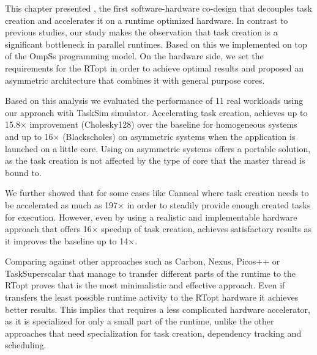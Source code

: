 This chapter presented {\proposal}, the first software-hardware co-design that decouples task creation and accelerates it on a runtime optimized hardware.
In contrast to previous studies, our study makes the observation that task creation is a significant bottleneck in parallel runtimes.
Based on this we implemented {\proposal} on top of the OmpSs programming model.
On the hardware side, we set the requirements for the RTopt in order to achieve optimal results and proposed an asymmetric architecture that combines it with general purpose cores.

Based on this analysis we evaluated the performance of 11 real workloads using our approach with TaskSim simulator.
Accelerating task creation, {\proposal} achieves up to 15.8$\times$ improvement (Cholesky128) over the baseline for homogeneous systems and up to 16$\times$ (Blackscholes) on asymmetric systems when the application is launched on a little core.
Using {\proposal} on asymmetric systems offers a portable solution, as the task creation is not affected by the type of core that the master thread is bound to. 


We further showed that for some cases like Canneal where task creation needs to be accelerated as much as 197$\times$ in order to steadily provide enough created tasks for execution.
However, even by using a realistic and implementable hardware approach that offers 16$\times$ speedup of task creation, achieves satisfactory results as it improves the baseline up to 14$\times$.

Comparing {\proposal} against other approaches such as Carbon, Nexus, Picos++ or TaskSuperscalar that manage to transfer different parts of the runtime to the RTopt proves that {\proposal} is the most minimalistic and effective approach.
Even if {\proposal} transfers the least possible runtime activity to the RTopt hardware it achieves better results.
This implies that {\proposal} requires a less complicated hardware accelerator, as it is specialized for only a small part of the runtime, unlike the other approaches that need specialization for task creation, dependency tracking and scheduling.



